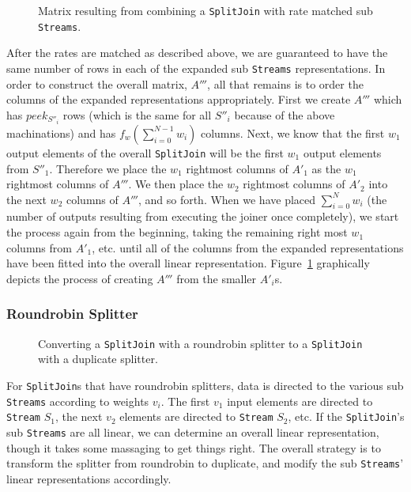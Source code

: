 \begin{figure}
\center
\epsfxsize=3.0in
\caption{Matrix resulting from combining a {\tt SplitJoin} with rate matched sub {\tt Streams}.}
\label{fig:splitjoin-duplicate-matrix}
\end{figure}

After the rates are matched as described above, we are guaranteed to have the same number of rows
in each of the expanded sub {\tt Streams} representations. In order to construct the overall matrix,
$A'''$, all that remains is to order the columns of the expanded representations appropriately. 
First we create $A'''$ which has $peek_{S''_i}$ rows (which is the same for all $S''_i$ because 
of the above machinations) and has $f_w(\sum_{i=0}^{N-1}w_i)$ columns. Next, we know that 
the first $w_1$ output elements of the overall {\tt SplitJoin} will be the first $w_1$ output elements
from $S''_1$. Therefore we place the $w_1$ rightmost columns of $A'_1$ as the $w_1$ rightmost 
columns of $A'''$. We then place the $w_2$ rightmost columns of $A'_2$ into the next $w_2$ columns 
of $A'''$, and so forth. When we have placed $\sum_{i=0}^{N}w_{i}$ (the number of outputs resulting from 
executing the joiner once completely), we start the process again from the beginning, taking the remaining
right most $w_1$ columns from $A'_1$, etc. until all of the columns from the expanded representations have
been fitted into the overall linear representation. Figure~\ref{fig:splitjoin-duplicate-matrix} 
graphically depicts the process of creating $A'''$ from the smaller $A'_i$s.



\subsubsection{Roundrobin Splitter}

\begin{figure}
\center
\epsfxsize=3.0in
\caption{Converting a {\tt SplitJoin} with a roundrobin splitter to a {\tt SplitJoin} with a duplicate splitter.}
\label{fig:splitjoin-roundrobin-to-duplicate}
\end{figure}

For {\tt SplitJoin}s that have roundrobin splitters, data is directed to the various sub {\tt Streams} 
according to weights $v_i$. The first $v_1$ input elements are directed to {\tt Stream} $S_1$, the next
$v_2$ elements are directed to {\tt Stream} $S_2$, etc. If the {\tt SplitJoin}'s sub {\tt Streams} are
all linear, we can determine an overall linear representation, though it takes some massaging to
get things right. The overall strategy is to transform the splitter from roundrobin to duplicate, 
and modify the sub {\tt Streams}' linear representations accordingly. 

